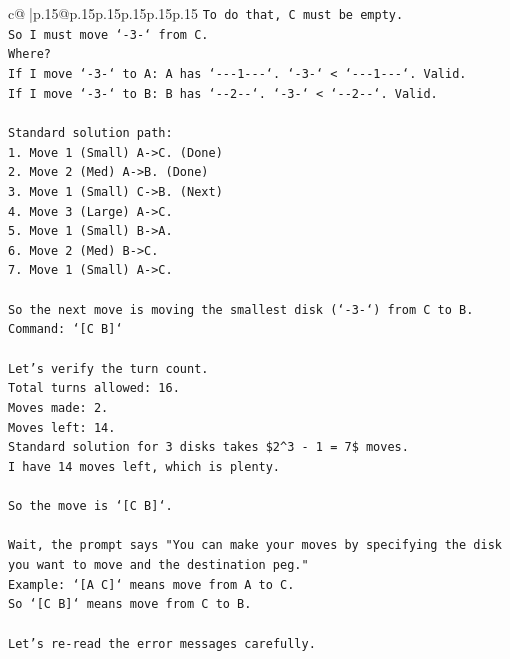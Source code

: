 \documentclass{article}
\begin{document}
{\begin{supertabular}{c@{$\;$}|p{.15\linewidth}@{}p{.15\linewidth}p{.15\linewidth}p{.15\linewidth}p{.15\linewidth}p{.15\linewidth}}
{{{\texttt{To do that, C must be empty.} \\
\texttt{So I must move `{-}3{-}` from C.} \\
\texttt{Where?} \\
\texttt{If I move `{-}3{-}` to A: A has `{-}{-}{-}1{-}{-}{-}`. `{-}3{-}` < `{-}{-}{-}1{-}{-}{-}`. Valid.} \\
\texttt{If I move `{-}3{-}` to B: B has `{-}{-}2{-}{-}`. `{-}3{-}` < `{-}{-}2{-}{-}`. Valid.} \\
\\ 
\texttt{Standard solution path:} \\
\texttt{1. Move 1 (Small) A{-}>C. (Done)} \\
\texttt{2. Move 2 (Med) A{-}>B. (Done)} \\
\texttt{3. Move 1 (Small) C{-}>B. (Next)} \\
\texttt{4. Move 3 (Large) A{-}>C.} \\
\texttt{5. Move 1 (Small) B{-}>A.} \\
\texttt{6. Move 2 (Med) B{-}>C.} \\
\texttt{7. Move 1 (Small) A{-}>C.} \\
\\ 
\texttt{So the next move is moving the smallest disk (`{-}3{-}`) from C to B.} \\
\texttt{Command: `{[}C B{]}`} \\
\\ 
\texttt{Let's verify the turn count.} \\
\texttt{Total turns allowed: 16.} \\
\texttt{Moves made: 2.} \\
\texttt{Moves left: 14.} \\
\texttt{Standard solution for 3 disks takes \$2\^{}3 {-} 1 = 7\$ moves.} \\
\texttt{I have 14 moves left, which is plenty.} \\
\\ 
\texttt{So the move is `{[}C B{]}`.} \\
\\ 
\texttt{Wait, the prompt says "You can make your moves by specifying the disk you want to move and the destination peg."} \\
\texttt{Example: `{[}A C{]}` means move from A to C.} \\
\texttt{So `{[}C B{]}` means move from C to B.} \\
\\ 
\texttt{Let's re{-}read the error messages carefully.} \\
}}}
\end{supertabular}}
\end{document}
